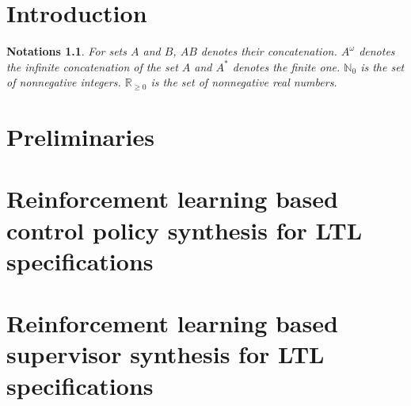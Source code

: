 \documentclass[a4j,12pt,oneside,openany,english,dvipdfmx]{jsbook}
\newtheorem{notations}{Notations}
\begin{document}
\clearpage
\tableofcontents
\clearpage
\setcounter{page}{0}

\chapter{Introduction}



\begin{notations}
  For sets $A$ and $B$, $AB$ denotes their concatenation. $A^{\omega}$ denotes the infinite concatenation of the set $A$ and $A^{\ast}$ denotes the finite one. $\mathbb{N}_0$ is the set of nonnegative integers. $\mathbb{R}_{\geq 0}$ is the set of nonnegative real numbers.
\end{notations}

\chapter{Preliminaries}



\chapter{Reinforcement learning based control policy synthesis for LTL specifications}



\chapter{Reinforcement learning based supervisor synthesis for LTL specifications}




\appendix
\end{document}
